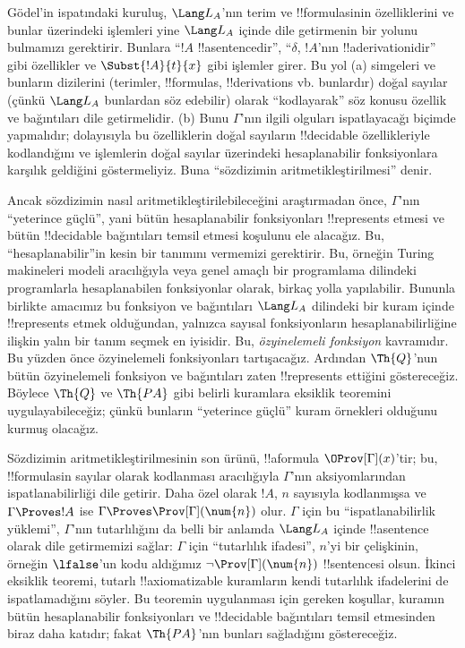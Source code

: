 \documentclass[../../../include/open-logic-section]{subfiles}
\begin{document}
G\"odel'in ispatındaki kuruluş, $\Lang L_A$'nın terim ve !!{formula}s{}inin
özelliklerini ve bunlar üzerindeki işlemleri yine $\Lang L_A$ içinde dile
getirmenin bir yolunu bulmamızı gerektirir. Bunlara ``$!A$ !!a{sentence}{}dir'',
``$\delta$, $!A$'nın !!a{derivation}{}idir'' gibi özellikler ve
$\Subst{!A}{t}{x}$ gibi işlemler girer. Bu yol (a) simgeleri ve bunların
dizilerini (terimler, !!{formula}s, !!{derivation}s vb. bunlardır)
doğal sayılar (çünkü $\Lang L_A$ bunlardan söz edebilir) olarak
``kodlayarak'' söz konusu özellik ve bağıntıları dile getirmelidir. (b)
Bunu $\Gamma$'nın ilgili olguları ispatlayacağı biçimde yapmalıdır;
dolayısıyla bu özelliklerin doğal sayıların !!{decidable} özellikleriyle
kodlandığını ve işlemlerin doğal sayılar üzerindeki hesaplanabilir
fonksiyonlara karşılık geldiğini göstermeliyiz. Buna ``sözdizimin
aritmetikleştirilmesi'' denir.

Ancak sözdizimin nasıl aritmetikleştirilebileceğini araştırmadan önce,
$\Gamma$'nın ``yeterince güçlü'', yani bütün hesaplanabilir fonksiyonları
!!{represents} etmesi ve bütün !!{decidable} bağıntıları temsil etmesi
koşulunu ele alacağız.
Bu, ``hesaplanabilir''in kesin bir tanımını vermemizi gerektirir. Bu,
örneğin Turing makineleri modeli aracılığıyla veya genel amaçlı bir
programlama dilindeki programlarla hesaplanabilen fonksiyonlar olarak,
birkaç yolla yapılabilir. Bununla birlikte amacımız bu fonksiyon ve
bağıntıları $\Lang L_A$ dilindeki bir kuram içinde !!{represents} etmek
olduğundan, yalnızca sayısal fonksiyonların hesaplanabilirliğine ilişkin
yalın bir tanım seçmek en iyisidir. Bu, \emph{özyinelemeli fonksiyon}
kavramıdır. Bu yüzden önce özyinelemeli fonksiyonları tartışacağız. Ardından
$\Th{Q}$'nun bütün özyinelemeli fonksiyon ve bağıntıları zaten
!!{represents} ettiğini göstereceğiz. Böylece $\Th{Q}$ ve $\Th{PA}$ gibi
belirli kuramlara eksiklik teoremini uygulayabileceğiz; çünkü bunların
``yeterince güçlü'' kuram örnekleri olduğunu kurmuş olacağız.

Sözdizimin aritmetikleştirilmesinin son ürünü, !!a{formula}
$\OProv[\Gamma](x)$'tir; bu, !!{formula}s{}in sayılar olarak kodlanması
aracılığıyla $\Gamma$'nın aksiyomlarından ispatlanabilirliği dile getirir. Daha özel olarak $!A$,
$n$ sayısıyla kodlanmışsa ve $\Gamma \Proves !A$ ise
$\Gamma \Proves \Prov[\Gamma](\num{n})$ olur. $\Gamma$ için bu
``ispatlanabilirlik yüklemi'', $\Gamma$'nın tutarlılığını da belli bir
anlamda $\Lang L_A$ içinde !!a{sentence} olarak dile getirmemizi sağlar:
$\Gamma$ için ``tutarlılık ifadesi'', $n$'yi bir çelişkinin, örneğin
$\lfalse$'un kodu aldığımız $\lnot \Prov[\Gamma](\num{n})$ !!{sentence}{}si
olsun. İkinci eksiklik teoremi, tutarlı !!{axiomatizable} kuramların kendi
tutarlılık ifadelerini de ispatlamadığını söyler. Bu teoremin uygulanması
için gereken koşullar, kuramın bütün hesaplanabilir fonksiyonları ve
!!{decidable} bağıntıları temsil etmesinden biraz daha katıdır; fakat
$\Th{PA}$'nın bunları sağladığını göstereceğiz.
\end{document}
